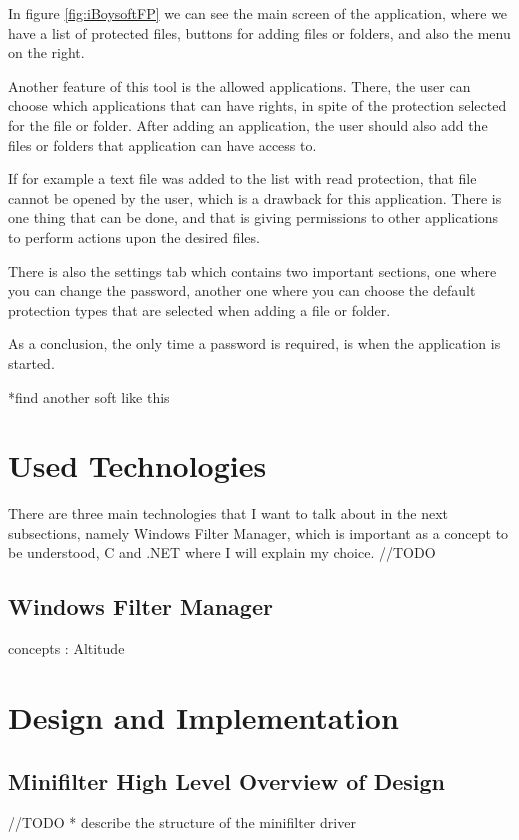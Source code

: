 	In figure \ref{fig:iBoysoftFP} we can see the main screen of the application, where we have a list of protected files, buttons for adding files or folders, and also the menu on the right. 
	
	Another feature of this tool is the allowed applications. There, the user can choose which applications that can have rights, in spite of the protection selected for the file or folder. After adding an application, the user should also add the files or folders that application can have access to.
	
	If for example a text file was added to the list with read protection, that file cannot be opened by the user, which is a drawback for this application. There is one thing that can be done, and that is giving permissions to other applications to perform actions upon the desired files.
	
	There is also the settings tab which contains two important sections, one where you can change the password, another one where you can choose the default protection types that are selected when adding a file or folder.
	
	As a conclusion, the only time a password is required, is when the application is started. 
	
	*find another soft like this
	
	\newpage
	\section{Used Technologies}
		There are three main technologies that I want to talk about in the next subsections, namely Windows Filter Manager, which is important as a concept to be understood, C and .NET where I will explain my choice. //TODO
		\subsection{Windows Filter Manager}
		
		
		concepts : Altitude
		
			
		
	\newpage
	\section{Design and Implementation}
		\subsection{Minifilter High Level Overview of Design}
		//TODO
		* describe the structure of the minifilter driver
		
